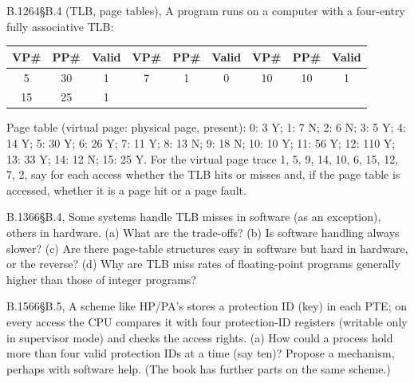 \begin{tbexercise}[B]{B.12}{64}{\S B.4 (TLB, page tables), }
A program runs on a computer with a four-entry fully associative TLB:
\begin{center}
\small
\begin{tabular}{@{}ccc@{\qquad}ccc@{\qquad}ccc@{}}
\toprule
VP\# & PP\# & Valid & VP\# & PP\# & Valid & VP\# & PP\# & Valid \\
\midrule
5 & 30 & 1 & 7 & 1 & 0 & 10 & 10 & 1 \\
15 & 25 & 1 & & & & & & \\
\bottomrule
\end{tabular}
\end{center}
Page table (virtual page: physical page, present): 0: 3 Y; 1: 7 N; 2: 6 N; 3: 5 Y;
4: 14 Y; 5: 30 Y; 6: 26 Y; 7: 11 Y; 8: 13 N; 9: 18 N; 10: 10 Y; 11: 56 Y; 12: 110 Y;
13: 33 Y; 14: 12 N; 15: 25 Y. For the virtual page trace 1, 5, 9, 14, 10, 6, 15,
12, 7, 2, say for each access whether the TLB hits or misses and, if the page
table is accessed, whether it is a page hit or a page fault.
\end{tbexercise}

\begin{tbexercise}[B]{B.13}{66}{\S B.4, }
Some systems handle TLB misses in software (as an exception), others in
hardware. (a) What are the trade-offs? (b) Is software handling always slower?
(c) Are there page-table structures easy in software but hard in hardware, or the
reverse? (d) Why are TLB miss rates of floating-point programs generally higher
than those of integer programs?
\end{tbexercise}

\begin{tbexercise}[B]{B.15}{66}{\S B.5, }
A scheme like HP/PA's stores a protection ID (key) in each PTE; on every access the
CPU compares it with four protection-ID registers (writable only in supervisor
mode) and checks the access rights. (a) How could a process hold more than four
valid protection IDs at a time (say ten)? Propose a mechanism, perhaps with
software help. (The book has further parts on the same scheme.)
\end{tbexercise}
